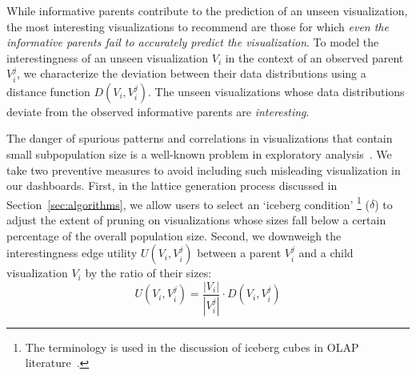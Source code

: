  While informative parents contribute to the prediction of an unseen visualization, the most interesting visualizations to recommend are those for which \emph{even the informative parents fail to accurately predict the visualization}.  To model the interestingness of an unseen visualization $V_i$ in the context of an observed parent $V_i^j$, we characterize the deviation between their data distributions using a distance function $D(V_i, V_i^j)$. The unseen visualizations whose data distributions deviate from the observed informative parents are \emph{interesting}.  

 The danger of spurious patterns and correlations in visualizations that contain small subpopulation size is a well-known problem in exploratory analysis~\cite{Binnig2017}. We take two preventive measures to avoid including such misleading visualization in our dashboards. First, in the lattice generation process discussed in Section~\ref{sec:algorithms}, we allow users to select an `iceberg condition' \footnote{The terminology is used in the discussion of iceberg cubes in OLAP literature~\cite{Xin2007}.} ($\delta$) to adjust the extent of pruning on visualizations whose sizes fall below a certain percentage of the overall population size. Second, we downweigh the interestingness edge utility $U(V_i, V_i^j)$ between a parent $V_i^j$ and a child visualization $V_i$ by the ratio of their sizes:
\begin{equation}
    U(V_i, V_i^j) = \frac{|V_i|}{|V_i^{j}|} \cdot D(V_i, V_i^j)
    \label{edge_utility}
\end{equation}
